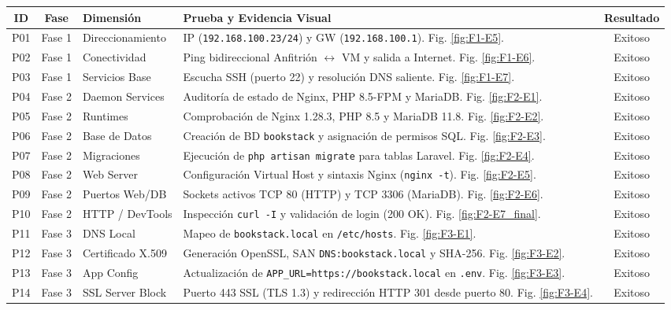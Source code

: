 \documentclass[12pt,a4paper]{article}
\begin{document}
\begin{table}[H]
\centering
\small
\begin{tabular}{|c|c|p{2.8cm}|p{6.6cm}|c|}
\hline
\textbf{ID} & \textbf{Fase} & \textbf{Dimensión} & \textbf{Prueba y Evidencia Visual} & \textbf{Resultado} \\ \hline
P01 & Fase 1 & Direccionamiento & IP (\texttt{192.168.100.23/24}) y GW (\texttt{192.168.100.1}). Fig. \ref{fig:F1-E5}. & Exitoso \\ \hline
P02 & Fase 1 & Conectividad & Ping bidireccional Anfitrión $\leftrightarrow$ VM y salida a Internet. Fig. \ref{fig:F1-E6}. & Exitoso \\ \hline
P03 & Fase 1 & Servicios Base & Escucha SSH (puerto 22) y resolución DNS saliente. Fig. \ref{fig:F1-E7}. & Exitoso \\ \hline
P04 & Fase 2 & Daemon Services & Auditoría de estado de Nginx, PHP 8.5-FPM y MariaDB. Fig. \ref{fig:F2-E1}. & Exitoso \\ \hline
P05 & Fase 2 & Runtimes & Comprobación de Nginx 1.28.3, PHP 8.5 y MariaDB 11.8. Fig. \ref{fig:F2-E2}. & Exitoso \\ \hline
P06 & Fase 2 & Base de Datos & Creación de BD \texttt{bookstack} y asignación de permisos SQL. Fig. \ref{fig:F2-E3}. & Exitoso \\ \hline
P07 & Fase 2 & Migraciones & Ejecución de \texttt{php artisan migrate} para tablas Laravel. Fig. \ref{fig:F2-E4}. & Exitoso \\ \hline
P08 & Fase 2 & Web Server & Configuración Virtual Host y sintaxis Nginx (\texttt{nginx -t}). Fig. \ref{fig:F2-E5}. & Exitoso \\ \hline
P09 & Fase 2 & Puertos Web/DB & Sockets activos TCP 80 (HTTP) y TCP 3306 (MariaDB). Fig. \ref{fig:F2-E6}. & Exitoso \\ \hline
P10 & Fase 2 & HTTP / DevTools & Inspección \texttt{curl -I} y validación de login (200 OK). Fig. \ref{fig:F2-E7_final}. & Exitoso \\ \hline
P11 & Fase 3 & DNS Local & Mapeo de \texttt{bookstack.local} en \texttt{/etc/hosts}. Fig. \ref{fig:F3-E1}. & Exitoso \\ \hline
P12 & Fase 3 & Certificado X.509 & Generación OpenSSL, SAN \texttt{DNS:bookstack.local} y SHA-256. Fig. \ref{fig:F3-E2}. & Exitoso \\ \hline
P13 & Fase 3 & App Config & Actualización de \texttt{APP\_URL=https://bookstack.local} en \texttt{.env}. Fig. \ref{fig:F3-E3}. & Exitoso \\ \hline
P14 & Fase 3 & SSL Server Block & Puerto 443 SSL (TLS 1.3) y redirección HTTP 301 desde puerto 80. Fig. \ref{fig:F3-E4}. & Exitoso \\ \hline

\end{tabular}
\end{table}
\end{document}
